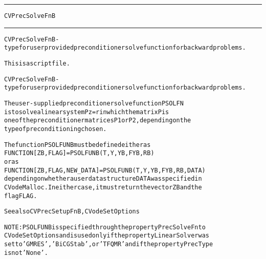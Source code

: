 \begin{samepage}
\hrule
\begin{center}
{\large \verb!CVPrecSolveFnB!}
\label{p:CVPrecSolveFnB}
\end{center}
\hrule\vspace{0.1in}



\begin{alltt}
CVPrecSolveFnB - type for user provided preconditioner solve function for backward problems.
\end{alltt}

\end{samepage}



\begin{samepage}


\begin{alltt}
This is a script file. 
\end{alltt}

\end{samepage}



\begin{alltt}
CVPrecSolveFnB - type for user provided preconditioner solve function for backward problems.

   The user-supplied preconditioner solve function PSOLFN
   is to solve a linear system P z = r in which the matrix P is
   one of the preconditioner matrices P1 or P2, depending on the
   type of preconditioning chosen.

   The function PSOLFUNB must be defined either as
        FUNCTION [ZB, FLAG] = PSOLFUNB(T,Y,YB,FYB,RB)
   or as
        FUNCTION [ZB, FLAG, NEW_DATA] = PSOLFUNB(T,Y,YB,FYB,RB,DATA)
   depending on whether a user data structure DATA was specified in
   CVodeMalloc. In either case, it must return the vector ZB and the
   flag FLAG.

   See also CVPrecSetupFnB, CVodeSetOptions

   NOTE: PSOLFUNB is specified through the property PrecSolveFn to
   CVodeSetOptions and is used only if the property LinearSolver was
   set to 'GMRES', 'BiCGStab', or 'TFQMR' and if the property PrecType
   is not 'None'.
\end{alltt}






\vspace{0.1in}